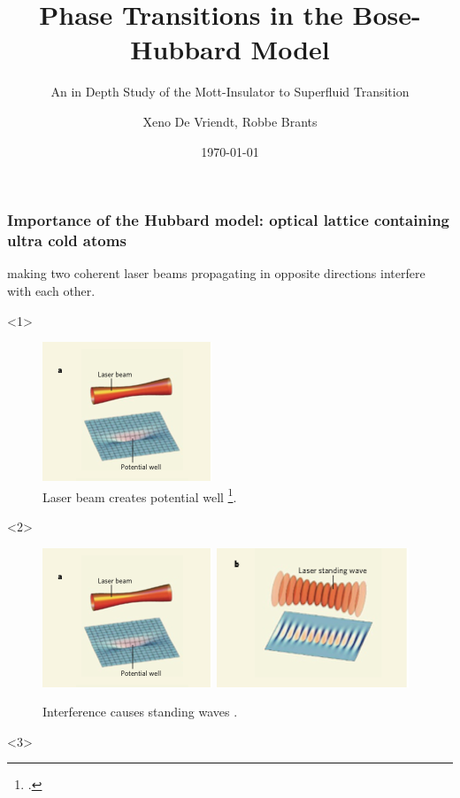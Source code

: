 \documentclass[aspectratio=169]{beamer}
\title{Phase Transitions in the Bose-Hubbard Model}
\subtitle{An in Depth Study of the Mott-Insulator to Superfluid Transition}
\author[DB]{Xeno De Vriendt, Robbe Brants}
\date{\today}
\begin{document}
\titleframe

\begin{frame}
  \frametitle{Importance of the Hubbard model: optical lattice containing ultra cold atoms}
  making two coherent laser beams propagating in opposite directions interfere with each other.
    \begin{onlyenv}<1>
      \begin{figure}
        \includegraphics[scale=0.5]{../img/Optical-lattice-creation-a.png}
        \caption{Laser beam creates potential well \footcite{Greiner2008}.}
      \end{figure}
    \end{onlyenv}
    \begin{onlyenv}<2>
      \begin{figure}
        \includegraphics[scale=0.5]{../img/Optical-lattice-creation-a.png} \includegraphics[scale=0.5]{../img/Optical-lattice-creation-b.png}
        \caption{Interference causes standing waves \footnotemark[1].}
      \end{figure} 
    \end{onlyenv}
    \begin{onlyenv}<3>
      \begin{figure}

\end{figure}
\end{onlyenv}
\end{frame}
\end{document}
